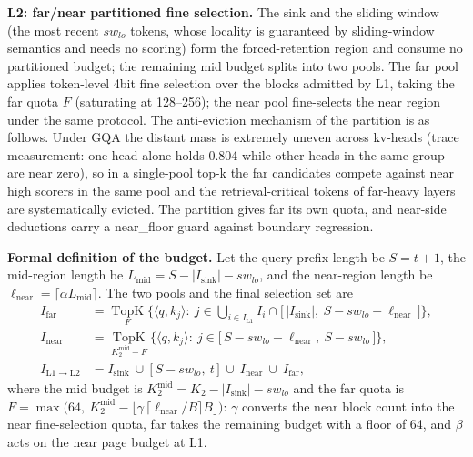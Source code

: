 \documentclass[11pt]{article}
\begin{document}
\textbf{L2: far/near partitioned fine selection.} The sink and the sliding window (the most recent $sw_{lo}$ tokens, whose locality is guaranteed by sliding-window semantics and needs no scoring) form the forced-retention region and consume no partitioned budget; the remaining mid budget splits into two pools. The far pool applies token-level 4bit fine selection over the blocks admitted by L1, taking the far quota $F$ (saturating at 128--256); the near pool fine-selects the near region under the same protocol. The anti-eviction mechanism of the partition is as follows. Under GQA the distant mass is extremely uneven across kv-heads (trace measurement: one head alone holds 0.804 while other heads in the same group are near zero), so in a single-pool top-k the far candidates compete against near high scorers in the same pool and the retrieval-critical tokens of far-heavy layers are systematically evicted. The partition gives far its own quota, and near-side deductions carry a near\_floor guard against boundary regression.

\textbf{Formal definition of the budget.} Let the query prefix length be $S=t+1$, the mid-region length be $L_{\mathrm{mid}}=S-|I_{\mathrm{sink}}|-sw_{lo}$, and the near-region length be $\ell_{\mathrm{near}}=\lceil\alpha L_{\mathrm{mid}}\rceil$. The two pools and the final selection set are
\begin{align}
I_{\mathrm{far}} &= \operatorname*{TopK}_{F}\Big\{\langle q,k_j\rangle:\ j\in\bigcup\nolimits_{i\in I_{\mathrm{L1}}} I_i\cap\big[\,|I_{\mathrm{sink}}|,\ S-sw_{lo}-\ell_{\mathrm{near}}\,\big]\Big\},\\
I_{\mathrm{near}} &= \operatorname*{TopK}_{K_2^{\mathrm{mid}}-F}\Big\{\langle q,k_j\rangle:\ j\in\big[\,S-sw_{lo}-\ell_{\mathrm{near}},\ S-sw_{lo}\,\big]\Big\},\\
I_{\mathrm{L1}\rightarrow\mathrm{L2}} &= I_{\mathrm{sink}}\ \cup\ \big[\,S-sw_{lo},\ t\,\big]\ \cup\ I_{\mathrm{near}}\ \cup\ I_{\mathrm{far}},
\end{align}
where the mid budget is $K_2^{\mathrm{mid}}=K_2-|I_{\mathrm{sink}}|-sw_{lo}$ and the far quota is $F=\max\big(64,\ K_2^{\mathrm{mid}}-\lfloor\gamma\,\lceil\ell_{\mathrm{near}}/B\rceil B\rfloor\big)$: $\gamma$ converts the near block count into the near fine-selection quota, far takes the remaining budget with a floor of 64, and $\beta$ acts on the near page budget at L1.
\end{document}

